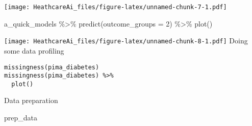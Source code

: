 \documentclass[
]{article}
\newenvironment{Shaded}{\begin{snugshade}}{\end{snugshade}}
\newcommand{\AttributeTok}[1]{\textcolor[rgb]{0.77,0.63,0.00}{#1}}
\newcommand{\DecValTok}[1]{\textcolor[rgb]{0.00,0.00,0.81}{#1}}
\newcommand{\FunctionTok}[1]{\textcolor[rgb]{0.00,0.00,0.00}{#1}}
\newcommand{\NormalTok}[1]{#1}
\newcommand{\SpecialCharTok}[1]{\textcolor[rgb]{0.00,0.00,0.00}{#1}}
\begin{document}
\texttt{[image: HeathcareAi\_files/figure-latex/unnamed-chunk-7-1.pdf]}

\begin{Shaded}
\begin{Highlighting}[]
\NormalTok{a\_quick\_models }\SpecialCharTok{\%\textgreater{}\%}
  \FunctionTok{predict}\NormalTok{(}\AttributeTok{outcome\_groups =} \DecValTok{2}\NormalTok{) }\SpecialCharTok{\%\textgreater{}\%}
  \FunctionTok{plot}\NormalTok{()}
\end{Highlighting}
\end{Shaded}

\texttt{[image: HeathcareAi\_files/figure-latex/unnamed-chunk-8-1.pdf]}
Doing some data profiling

\begin{verbatim}
missingness(pima_diabetes)
missingness(pima_diabetes) %>%
  plot()
\end{verbatim}

Data preparation

\begin{Shaded}
\begin{Highlighting}[]
\NormalTok{prep\_data}
\end{Highlighting}
\end{Shaded}
\end{document}
